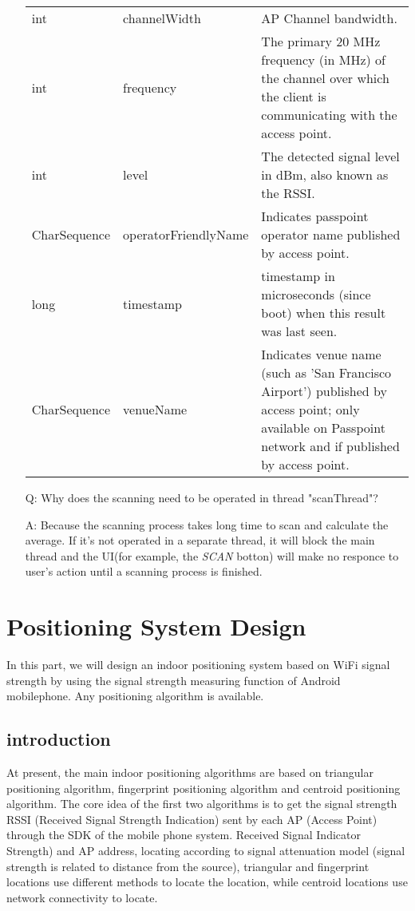 \documentclass[12pt]{report}
\begin{document}
\begin{enumerate}
\begin{tabular}{p{3cm}p{4cm}p{7cm}}
		int & channelWidth & AP Channel bandwidth.\\
		int & frequency & The primary 20 MHz frequency (in MHz) of the channel over which the client is communicating with the access point. \\
		int & level & The detected signal level in dBm, also known as the RSSI. \\
		CharSequence & operatorFriendlyName & Indicates passpoint operator name published by access point. \\
		long & timestamp & timestamp in microseconds (since boot) when this result was last seen. \\
		CharSequence & venueName & Indicates venue name (such as 'San Francisco Airport') published by access point; only available on Passpoint network and if published by access point.\\
		\bottomrule
	\end{tabular}
	\item[Q:]  Why does the scanning need to be operated in thread "scanThread"?
	\item[A:]  Because the scanning process takes long time to scan and calculate the average. If it's not operated in a separate thread, it will block the main thread and the UI(for example, the \textit{SCAN} botton) will make no responce to user's action until a scanning process is finished.
\end{enumerate}

\section{Positioning System Design}
In this part, we will design an indoor positioning system based on WiFi signal strength by using the signal strength measuring function of Android mobilephone. Any positioning algorithm is available.
\subsection{introduction}
At present, the main indoor positioning algorithms are based on triangular positioning algorithm, fingerprint positioning algorithm and centroid positioning algorithm. The core idea of the first two algorithms is to get the signal strength RSSI (Received Signal Strength Indication) sent by each AP (Access Point) through the SDK of the mobile phone system. Received Signal Indicator Strength) and AP address, locating according to signal attenuation model (signal strength is related to distance from the source), triangular and fingerprint locations use different methods to locate the location, while centroid locations use network connectivity to locate.
\end{document}
